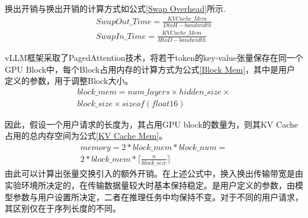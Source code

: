 \documentclass[a4paper, nosysfonts]{hpcchina}
\begin{document}
换出开销与换出开销的计算方式如公式\ref{Swap Overhead}所示.
\begin{equation}
  \begin{aligned}
    SwapOut\_Time=\frac{KVCache\_Mem}{DtoH-bandwidth} \\
    SwapIn\_Time=\frac{KVCache\_Mem}{HtoD-bandwidth}
  \end{aligned}
  \label{Swap Overhead}
\end{equation}

vLLM框架采取了PagedAttention技术，将若干token的key-value张量保存在同一个GPU Block中，每个Block占用内存的计算方式为公式\ref{Block Mem}，其中是用户定义的参数，用于调整Block大小。
\begin{equation}
  \begin{aligned}
    block\_mem = num\_layers \times hidden\_size \times 
    \\ block\_size \times sizeof(float16)
  \end{aligned}
  \label{Block Mem}
\end{equation}

因此，假设一个用户请求的长度为，其占用GPU block的数量为，则其KV Cache占用的总内存空间为公式\ref{KV Cache Mem}。
\begin{equation}
  \begin{aligned}
    memory = 2 * block\_mem * block\_num =  \\
    2 * block\_mem * \lceil \frac{n}{block\_size} \rceil
  \end{aligned}
  \label{KV Cache Mem}
\end{equation}
由此可以计算出张量交换引入的额外开销。在上述公式中，换入换出传输带宽是由实验环境所决定的，在传输数据量较大时基本保持稳定。是用户定义的参数，由模型参数与用户设置所决定，二者在推理任务中均保持不变。对于不同的用户请求，其区别仅在于序列长度的不同。
\end{document}
